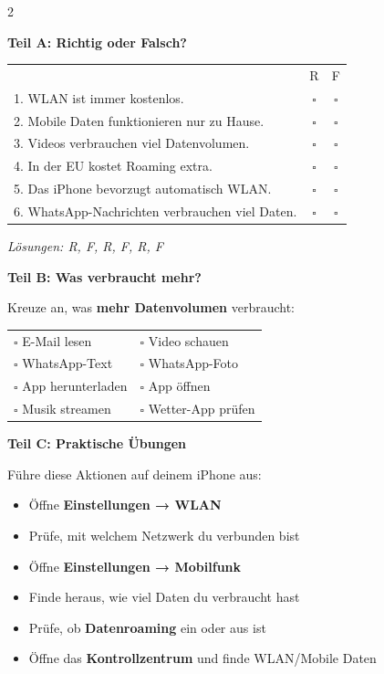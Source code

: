 \documentclass[a4paper,landscape,8pt]{extarticle}
\begin{document}
\begin{multicols}{2}

\textbf{\large Teil A: Richtig oder Falsch?}

\vspace{2mm}

\renewcommand{\arraystretch}{1.4}
\begin{tabular}{@{}p{8cm}cc@{}}
& R & F \\
1. WLAN ist immer kostenlos. & $\square$ & $\square$ \\
2. Mobile Daten funktionieren nur zu Hause. & $\square$ & $\square$ \\
3. Videos verbrauchen viel Datenvolumen. & $\square$ & $\square$ \\
4. In der EU kostet Roaming extra. & $\square$ & $\square$ \\
5. Das iPhone bevorzugt automatisch WLAN. & $\square$ & $\square$ \\
6. WhatsApp-Nachrichten verbrauchen viel Daten. & $\square$ & $\square$ \\
\end{tabular}
\renewcommand{\arraystretch}{1}

\textit{\footnotesize Lösungen: R, F, R, F, R, F}

\vspace{4mm}

\textbf{\large Teil B: Was verbraucht mehr?}

Kreuze an, was \textbf{mehr Datenvolumen} verbraucht:

\vspace{2mm}

\begin{tabular}{@{}p{5cm}p{5cm}@{}}
$\square$ E-Mail lesen & $\square$ Video schauen \\[3mm]
$\square$ WhatsApp-Text & $\square$ WhatsApp-Foto \\[3mm]
$\square$ App herunterladen & $\square$ App öffnen \\[3mm]
$\square$ Musik streamen & $\square$ Wetter-App prüfen \\
\end{tabular}

\vspace{4mm}

\textbf{\large Teil C: Praktische Übungen}

Führe diese Aktionen auf deinem iPhone aus:

\vspace{2mm}

\begin{itemize}[label=$\square$, itemsep=3pt]
\item Öffne \textbf{Einstellungen → WLAN}
\item Prüfe, mit welchem Netzwerk du verbunden bist
\item Öffne \textbf{Einstellungen → Mobilfunk}
\item Finde heraus, wie viel Daten du verbraucht hast
\item Prüfe, ob \textbf{Datenroaming} ein oder aus ist
\item Öffne das \textbf{Kontrollzentrum} und finde WLAN/Mobile Daten
\end{itemize}


\end{multicols}
\end{document}
